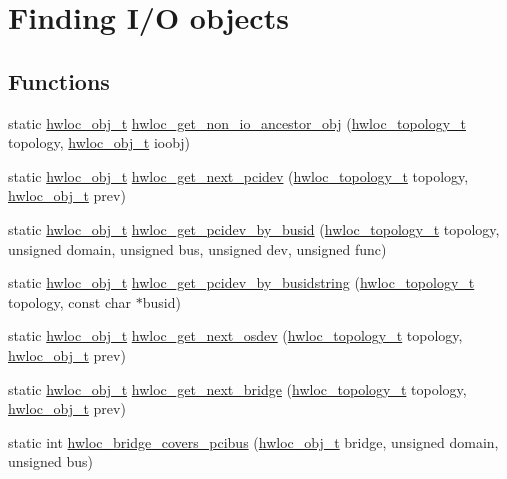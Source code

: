 \hypertarget{a00204}{}\section{Finding I/O objects}
\label{a00204}
\subsection*{Functions}
\begin{DoxyCompactItemize}
\item 
static \hyperlink{a00185_ga79b8ab56877ef99ac59b833203391c7d}{hwloc\+\_\+obj\+\_\+t} \hyperlink{a00204_gaf139bb61375178e90cc3f1835b452ab6}{hwloc\+\_\+get\+\_\+non\+\_\+io\+\_\+ancestor\+\_\+obj} (\hyperlink{a00186_ga9d1e76ee15a7dee158b786c30b6a6e38}{hwloc\+\_\+topology\+\_\+t} topology, \hyperlink{a00185_ga79b8ab56877ef99ac59b833203391c7d}{hwloc\+\_\+obj\+\_\+t} ioobj)
\item 
static \hyperlink{a00185_ga79b8ab56877ef99ac59b833203391c7d}{hwloc\+\_\+obj\+\_\+t} \hyperlink{a00204_ga66470dabce9db19a57c5940a909d0baa}{hwloc\+\_\+get\+\_\+next\+\_\+pcidev} (\hyperlink{a00186_ga9d1e76ee15a7dee158b786c30b6a6e38}{hwloc\+\_\+topology\+\_\+t} topology, \hyperlink{a00185_ga79b8ab56877ef99ac59b833203391c7d}{hwloc\+\_\+obj\+\_\+t} prev)
\item 
static \hyperlink{a00185_ga79b8ab56877ef99ac59b833203391c7d}{hwloc\+\_\+obj\+\_\+t} \hyperlink{a00204_gacdbaf0db98872e224b7883a84bfb0455}{hwloc\+\_\+get\+\_\+pcidev\+\_\+by\+\_\+busid} (\hyperlink{a00186_ga9d1e76ee15a7dee158b786c30b6a6e38}{hwloc\+\_\+topology\+\_\+t} topology, unsigned domain, unsigned bus, unsigned dev, unsigned func)
\item 
static \hyperlink{a00185_ga79b8ab56877ef99ac59b833203391c7d}{hwloc\+\_\+obj\+\_\+t} \hyperlink{a00204_ga23a978469353134b3104b846fe2efceb}{hwloc\+\_\+get\+\_\+pcidev\+\_\+by\+\_\+busidstring} (\hyperlink{a00186_ga9d1e76ee15a7dee158b786c30b6a6e38}{hwloc\+\_\+topology\+\_\+t} topology, const char $\ast$busid)
\item 
static \hyperlink{a00185_ga79b8ab56877ef99ac59b833203391c7d}{hwloc\+\_\+obj\+\_\+t} \hyperlink{a00204_ga8b4584c8949e2c5f1c97ba7fe92b8145}{hwloc\+\_\+get\+\_\+next\+\_\+osdev} (\hyperlink{a00186_ga9d1e76ee15a7dee158b786c30b6a6e38}{hwloc\+\_\+topology\+\_\+t} topology, \hyperlink{a00185_ga79b8ab56877ef99ac59b833203391c7d}{hwloc\+\_\+obj\+\_\+t} prev)
\item 
static \hyperlink{a00185_ga79b8ab56877ef99ac59b833203391c7d}{hwloc\+\_\+obj\+\_\+t} \hyperlink{a00204_ga9dba22a3f4f701f2a46780ba9a0bbbe7}{hwloc\+\_\+get\+\_\+next\+\_\+bridge} (\hyperlink{a00186_ga9d1e76ee15a7dee158b786c30b6a6e38}{hwloc\+\_\+topology\+\_\+t} topology, \hyperlink{a00185_ga79b8ab56877ef99ac59b833203391c7d}{hwloc\+\_\+obj\+\_\+t} prev)
\item 
static int \hyperlink{a00204_ga0d92a9462a3d317f29ecb4442a307fb1}{hwloc\+\_\+bridge\+\_\+covers\+\_\+pcibus} (\hyperlink{a00185_ga79b8ab56877ef99ac59b833203391c7d}{hwloc\+\_\+obj\+\_\+t} bridge, unsigned domain, unsigned bus)
\end{DoxyCompactItemize}


